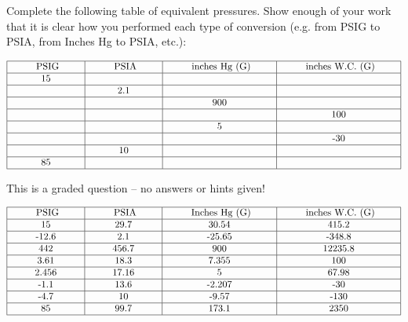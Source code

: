 

Complete the following table of equivalent pressures.  Show enough of your work that it is clear how you performed each type of conversion (e.g. from PSIG to PSIA, from Inches Hg to PSIA, etc.):


$$\vbox{\offinterlineskip
\halign{\strut
\vrule \quad\hfil # \ \hfil & 
\vrule \quad\hfil # \ \hfil & 
\vrule \quad\hfil # \ \hfil & 
\vrule \quad\hfil # \ \hfil \vrule \cr
\noalign{\hrule}
%
\hskip 20pt PSIG \hskip 20pt & \hskip 20pt PSIA \hskip 20pt & \hskip 20pt inches Hg (G) \hskip 20pt & \hskip 20pt inches W.C. (G) \hskip 20pt \cr
%
\noalign{\hrule}
%
15 &  &  &  \cr
%
\noalign{\hrule}
%
  & 2.1 &  &  \cr
%
\noalign{\hrule}
%
  &  & 900 &  \cr
%
\noalign{\hrule}
%
  &  &  & 100 \cr
%
\noalign{\hrule}
%
  &  & 5 &  \cr
%
\noalign{\hrule}
%
  &  &  & -30 \cr
%
\noalign{\hrule}
%
  & 10 &  &  \cr
%
\noalign{\hrule}
%
85  &  &  &  \cr
%
\noalign{\hrule}
} %
}$$ %

\vfil 

\eject






This is a graded question -- no answers or hints given!








$$\vbox{\offinterlineskip
\halign{\strut
\vrule \quad\hfil # \ \hfil & 
\vrule \quad\hfil # \ \hfil & 
\vrule \quad\hfil # \ \hfil & 
\vrule \quad\hfil # \ \hfil \vrule \cr
\noalign{\hrule}
%
\hskip 20pt PSIG \hskip 20pt & \hskip 20pt PSIA \hskip 20pt & \hskip 20pt Inches Hg (G) \hskip 20pt & \hskip 20pt inches W.C. (G) \hskip 20pt \cr
%
\noalign{\hrule}
%
15 & 29.7 & 30.54 & 415.2 \cr
%
\noalign{\hrule}
%
-12.6 & 2.1 & -25.65 & -348.8 \cr
%
\noalign{\hrule}
%
442 & 456.7 & 900 & 12235.8 \cr
%
\noalign{\hrule}
%
3.61 & 18.3 & 7.355 & 100 \cr
%
\noalign{\hrule}
%
2.456 & 17.16 & 5 & 67.98 \cr
%
\noalign{\hrule}
%
-1.1 & 13.6 & -2.207 & -30 \cr
%
\noalign{\hrule}
%
-4.7 & 10 & -9.57 & -130 \cr
%
\noalign{\hrule}
%
85 & 99.7 & 173.1 & 2350 \cr
%
\noalign{\hrule}
} %
}$$ %




